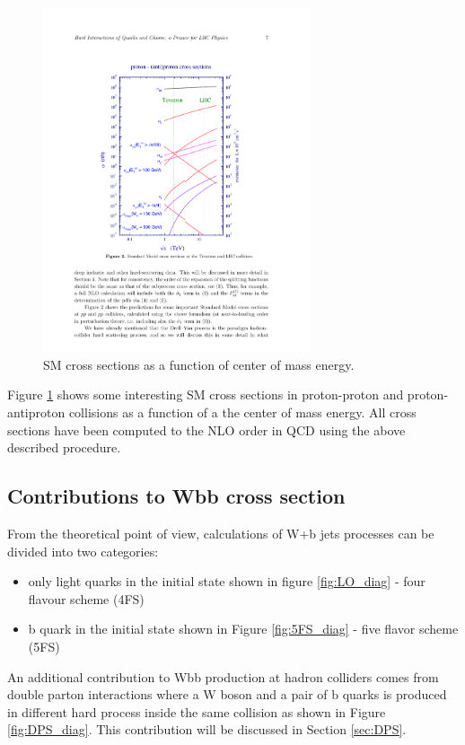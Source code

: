 \begin{figure}[htbp]
	\centering
		\includegraphics[width=0.7\textwidth]{Figures/pp_xsec.pdf}
	\caption[Proton-proton cross sections]{SM cross sections as a function of center of mass energy.\cite{Campbell:2006wx} }
	\label{fig:pp_xsec}
\end{figure}
\par Figure \ref{fig:pp_xsec} shows some interesting SM cross sections in proton-proton and proton-antiproton collisions as a function of a the center of mass energy. All cross sections have been computed to the NLO order in QCD using the above described procedure.

 

\subsection{Contributions to Wbb cross section}


From the theoretical point of view, calculations of W+b jets processes can be divided into two categories:
\begin{itemize}
\item only light quarks in the initial state shown in figure \ref{fig:LO_diag} - four flavour scheme (4FS)
\item b quark in the initial state shown in Figure \ref{fig:5FS_diag} - five flavor scheme (5FS) 
\end{itemize}
An additional contribution to Wbb production at hadron colliders comes from double parton interactions where a W boson and a pair of b quarks is produced in different hard process inside the same collision as shown in Figure \ref{fig:DPS_diag}. This contribution will be discussed in Section \ref{sec:DPS}.

